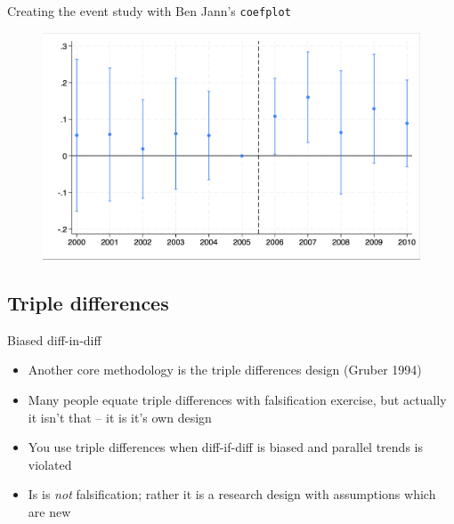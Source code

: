 \documentclass{beamer}
\begin{document}
\begin{frame}{Creating the event study with Ben Jann's \texttt{coefplot}}

	\begin{figure}
	\includegraphics[scale=0.20]{./lecture_includes/simple_eventstudy.png}
	\end{figure}

\end{frame}





\subsection{Triple differences}




\begin{frame}{Biased diff-in-diff}

\begin{itemize}

\item Another core methodology is the triple differences design (Gruber 1994)
\item Many people equate triple differences with falsification exercise, but actually it isn't that -- it is it's own design
\item You use triple differences when diff-if-diff is biased and parallel trends is violated
\item Is is \emph{not} falsification; rather it is a research design with assumptions which are new
\end{itemize}

\end{frame}
\end{document}
